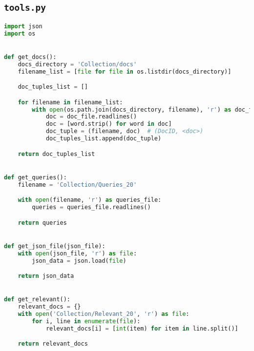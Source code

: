 ﻿\subsection{\texttt{tools.py}}
\begin{lstlisting}[language=Python]
import json
import os


def get_docs():
    docs_directory = 'Collection/docs'
    filename_list = [file for file in os.listdir(docs_directory)]

    doc_tuples_list = []

    for filename in filename_list:
        with open(os.path.join(docs_directory, filename), 'r') as doc_file:
            doc = doc_file.readlines()
            doc = [word.strip() for word in doc]
            doc_tuple = (filename, doc)  # (DocID, <doc>)
            doc_tuples_list.append(doc_tuple)

    return doc_tuples_list


def get_queries():
    filename = 'Collection/Queries_20'

    with open(filename, 'r') as queries_file:
        queries = queries_file.readlines()

    return queries


def get_json_file(json_file):
    with open(json_file, 'r') as file:
        json_data = json.load(file)

    return json_data


def get_relevant():
    relevant_docs = {}
    with open('Collection/Relevant_20', 'r') as file:
        for i, line in enumerate(file):
            relevant_docs[i] = [int(item) for item in line.split()]

    return relevant_docs
\end{lstlisting}


